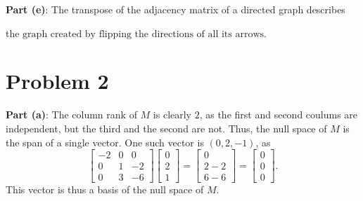 \documentclass[11pt]{article}
\begin{document}
\textbf{Part (e)}: The transpose of the adjacency matrix of a directed graph describes 

the $\boxed{\text{graph created by flipping the directions of all its arrows}}$.


\section{Problem 2}

\textbf{Part (a)}: The column rank of $M$ is clearly $2$, as the first and second coulums are independent, but the third and the second are not. Thus, the null space of $M$ is the span of a single vector. One such vector is $(0, 2, -1)$, as
\[
	\begin{bmatrix} -2 & 0 & 0 \\ 0 & 1 & -2 \\ 0 & 3 & -6 \end{bmatrix} \begin{bmatrix} 0 \\ 2 \\ 1 \end{bmatrix} = \begin{bmatrix} 0 \\ 2 - 2 \\ 6 - 6 \end{bmatrix} = \begin{bmatrix} 0 \\ 0 \\ 0 \end{bmatrix}.
\]
This vector is thus a basis of the null space of $M$.
\end{document}
